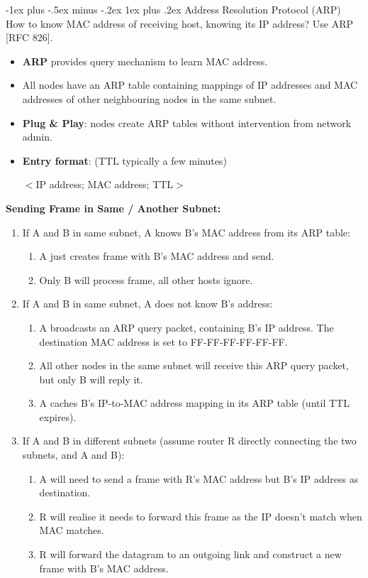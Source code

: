 \documentclass[12pt, landscape]{article}
\makeatletter
\renewcommand{\subsubsection}{\@startsection{subsubsection}{3}{0.1mm}%
                                {-1ex plus -.5ex minus -.2ex}%
                                {1ex plus .2ex}%
                                {\normalfont\small\bfseries}}
\makeatother
\begin{document}
\begin{multicols*}{3}
\subsubsection{Address Resolution Protocol (ARP)}
How to know MAC address of receiving host, knowing its IP address? Use ARP [RFC 826].
\begin{itemize}
\item \textbf{ARP} provides query mechanism to learn MAC address.
\item All nodes have an ARP table containing mappings of IP addresses and MAC addresses of other neighbouring
nodes in the same subnet. 
\item \textbf{Plug \& Play}: nodes create ARP tables without intervention from network admin.
\item \textbf{Entry format}: (TTL typically a few minutes)\\
\centerline{$<$IP address; MAC address; TTL$>$}
\end{itemize}
\textbf{Sending Frame in Same / Another Subnet:}
\begin{enumerate}
\item If A and B in same subnet, A knows B’s MAC address from its ARP table:
	\begin{enumerate}
	\item A just creates frame with B’s MAC address and send.
	\item Only B will process frame, all other hosts ignore.
	\end{enumerate}
\item If A and B in same subnet, A does not know B’s address:
	\begin{enumerate}
	\item A broadcasts an ARP query packet, containing B’s IP address. The destination MAC address is set to FF-FF-FF-FF-FF-FF.
	\item All other nodes in the same subnet will receive this ARP query packet, but only B will reply it.
	\item A caches B’s IP-to-MAC address mapping in its ARP table (until TTL expires).
	\end{enumerate}
\item If A and B in different subnets (assume router R directly connecting the two subnets, and A and B):
	\begin{enumerate}
	\item A will need to send a frame with R’s MAC address but B’s IP address as destination.
	\item R will realise it needs to forward this frame as the IP doesn’t match when MAC matches.
	\item R will forward the datagram to an outgoing link and construct a new frame with B’s MAC address.
	\end{enumerate}
\end{enumerate}


\end{multicols*}
\end{document}
